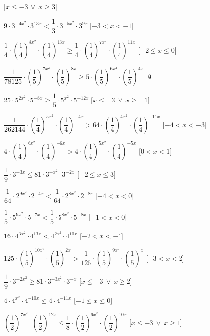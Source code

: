 \begin{esercizio}
\begin{enumeratea}
   \hfill [\(x \leqslant -3~\vee~x \geqslant 3\)]
  \item  \(9 \cdot 3^{{-4x^2}} \cdot 3^{{13x}} < \dfrac{1}{3} \cdot 
3^{{-5x^2}} \cdot 3^{{9x}}\)
   \hfill [\(-3 < x < -1\)]
  \item  \(\dfrac{1}{4} \cdot \left(\dfrac{1}{4}\right)^{{8x^2}} \cdot 
\left(\dfrac{1}{4}\right)^{{13x}} \geqslant \dfrac{1}{4} \cdot 
\left(\dfrac{1}{4}\right)^{{7x^2}} \cdot \left(\dfrac{1}{4}\right)^{{11x}}\)
   \hfill [\(-2 \leqslant x \leqslant 0\)]
  \item  \(\dfrac{1}{78125} \cdot \left(\dfrac{1}{5}\right)^{{7x^2}} \cdot 
\left(\dfrac{1}{5}\right)^{{8x}} \geqslant 5 \cdot 
\left(\dfrac{1}{5}\right)^{{6x^2}} \cdot \left(\dfrac{1}{5}\right)^{{4x}}\)
   \hfill [\(\emptyset\)]
  \item  \(25 \cdot 5^{{2x^2}} \cdot 5^{{-8x}} \geqslant \dfrac{1}{5} \cdot 
5^{{x^2}} \cdot 5^{{-12x}}\)
   \hfill [\(x \leqslant -3~\vee~x \geqslant -1\)]
  \item  \(\dfrac{1}{262144} \cdot \left(\dfrac{1}{4}\right)^{{5x^2}} \cdot 
\left(\dfrac{1}{4}\right)^{{-4x}} > 64 \cdot 
\left(\dfrac{1}{4}\right)^{{4x^2}} \cdot 
\left(\dfrac{1}{4}\right)^{{-11x}}\)
   \hfill [\(-4 < x < -3\)]
  \item  \(4 \cdot \left(\dfrac{1}{4}\right)^{{6x^2}} \cdot 
\left(\dfrac{1}{4}\right)^{{-6x}} > 4 \cdot 
\left(\dfrac{1}{4}\right)^{{5x^2}} \cdot \left(\dfrac{1}{4}\right)^{{-5x}}\)
   \hfill [\(0 < x < 1\)]
  \item  \(\dfrac{1}{9} \cdot 3^{{-3x}} \leqslant 81 \cdot 3^{{-x^2}} \cdot 
3^{{-2x}}\)
   \hfill [\(-2 \leqslant x \leqslant 3\)]
  \item  \(\dfrac{1}{64} \cdot 2^{{9x^2}} \cdot 2^{{-4x}} < \dfrac{1}{64} 
\cdot 2^{{8x^2}} \cdot 2^{{-8x}}\)
   \hfill [\(-4 < x < 0\)]
  \item  \(\dfrac{1}{5} \cdot 5^{{9x^2}} \cdot 5^{{-7x}} < \dfrac{1}{5} 
\cdot 5^{{8x^2}} \cdot 5^{{-8x}}\)
   \hfill [\(-1 < x < 0\)]
  \item  \(16 \cdot 4^{{3x^2}} \cdot 4^{{13x}} < 4^{{2x^2}} \cdot 
4^{{10x}}\)
   \hfill [\(-2 < x < -1\)]
  \item  \(125 \cdot \left(\dfrac{1}{5}\right)^{{10x^2}} \cdot 
\left(\dfrac{1}{5}\right)^{{2x}} > \dfrac{1}{125} \cdot 
\left(\dfrac{1}{5}\right)^{{9x^2}} \cdot \left(\dfrac{1}{5}\right)^{{x}}\)
   \hfill [\(-3 < x < 2\)]
  \item  \(\dfrac{1}{9} \cdot 3^{{-2x^2}} \geqslant 81 \cdot 3^{{-3x^2}} 
\cdot 3^{{-x}}\)
   \hfill [\(x \leqslant -3~\vee~x \geqslant 2\)]
  \item  \(4 \cdot 4^{{x^2}} \cdot 4^{{-10x}} \leqslant 4 \cdot 4^{{-11x}}\)
   \hfill [\(-1 \leqslant x \leqslant 0\)]
  \item  \(\left(\dfrac{1}{2}\right)^{{7x^2}} \cdot 
\left(\dfrac{1}{2}\right)^{{12x}} \leqslant \dfrac{1}{8} \cdot 
\left(\dfrac{1}{2}\right)^{{6x^2}} \cdot \left(\dfrac{1}{2}\right)^{{10x}}\)
   \hfill [\(x \leqslant -3~\vee~x \geqslant 1\)]
 \end{enumeratea}
\end{esercizio}



